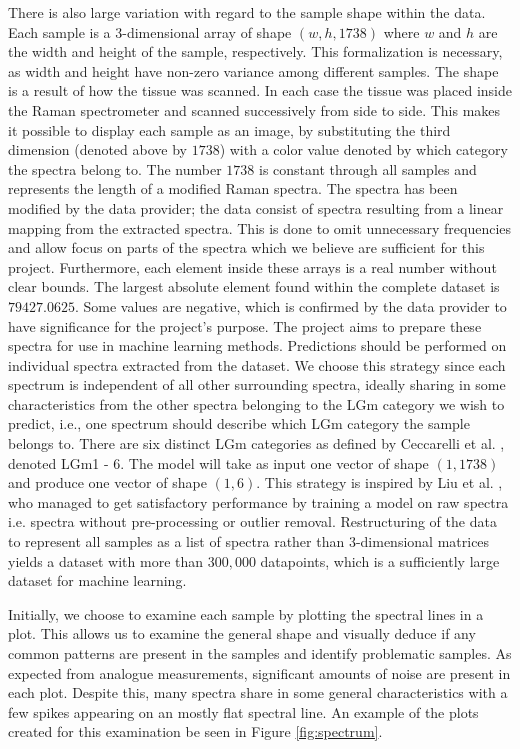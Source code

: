 There is also large variation with regard to the sample shape within the data. Each sample is a 3-dimensional array of shape $(w, h, 1738)$ where $w$ and $h$ are the width and height of the sample, respectively. This formalization is necessary, as width and height have non-zero variance among different samples. The shape is a result of how the tissue was scanned. In each case the tissue was placed inside the Raman spectrometer and scanned successively from side to side. This makes it possible to display each sample as an image, by substituting the third dimension (denoted above by $1738$) with a color value denoted by which category the spectra belong to. The number $1738$ is constant through all samples and represents the length of a modified Raman spectra. The spectra has been modified by the data provider; the data consist of spectra resulting from a linear mapping from the extracted spectra. This is done to omit unnecessary frequencies and allow focus on parts of the spectra which we believe are sufficient for this project. Furthermore, each element inside these arrays is a real number without clear bounds. The largest absolute element found within the complete dataset is $79427.0625$. Some values are negative, which is confirmed by the data provider to have significance for the project's purpose. The project aims to prepare these spectra for use in machine learning methods. Predictions should be performed on individual spectra extracted from the dataset. We choose this strategy since each spectrum is independent of all other surrounding spectra, ideally sharing in some characteristics from the other spectra belonging to the LGm category we wish to predict, i.e., one spectrum should describe which LGm category the sample belongs to. There are six distinct LGm categories as defined by Ceccarelli et al. \cite{cellsubsets}, denoted LGm1 - 6. The model will take as input one vector of shape $(1, 1738)$ and produce one vector of shape $(1, 6)$. This strategy is inspired by Liu et al. \cite{liu2017deep}, who managed to get satisfactory performance by training a model on raw spectra i.e. spectra without pre-processing or outlier removal. Restructuring of the data to represent all samples as a list of spectra rather than 3-dimensional matrices yields a dataset with more than $300,000$ datapoints, which is a sufficiently large dataset for machine learning.

Initially, we choose to examine each sample by plotting the spectral lines in a plot. This allows us to examine the general shape and visually deduce if any common patterns are present in the samples and identify problematic samples. As expected from analogue measurements, significant amounts of noise are present in each plot. Despite this, many spectra share in some general characteristics with a few spikes appearing on an mostly flat spectral line. An example of the plots created for this examination be seen in Figure \ref{fig:spectrum}.

